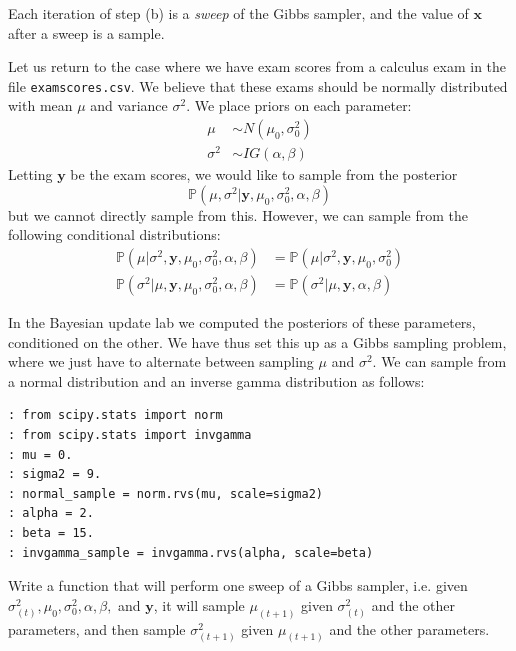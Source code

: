Each iteration of step (b) is a \emph{sweep} of the Gibbs sampler, and the value of $\mathbf{x}$ after a sweep is a sample.

Let us return to the case where we have exam scores from a calculus exam in the file \texttt{examscores.csv}. We believe that these exams should be normally distributed with mean $\mu$ and variance $\sigma^{2}$. We place priors on each parameter:
\begin{align*}
\mu & \sim N(\mu_{0}, \sigma_{0}^{2}) \\
\sigma^{2} & \sim IG(\alpha, \beta)
\end{align*}
Letting $\mathbf{y}$ be the exam scores, we would like to sample from the posterior
\begin{equation*}
\mathbb{P}(\mu, \sigma^{2} | \mathbf{y}, \mu_{0}, \sigma_{0}^{2}, \alpha, \beta)
\end{equation*}
but we cannot directly sample from this. However, we can sample from the following conditional distributions:
\begin{align*}
\mathbb{P}(\mu | \sigma^{2}, \mathbf{y}, \mu_{0}, \sigma_{0}^{2}, \alpha, \beta) & = \mathbb{P}(\mu | \sigma^{2}, \mathbf{y}, \mu_{0}, \sigma_{0}^{2})\\
\mathbb{P}(\sigma^{2} | \mu, \mathbf{y}, \mu_{0}, \sigma_{0}^{2}, \alpha, \beta) & = \mathbb{P}(\sigma^{2} | \mu, \mathbf{y}, \alpha, \beta)
\end{align*}

In the Bayesian update lab we computed the posteriors of these parameters, conditioned on the other. We have thus set this up as a Gibbs sampling problem, where we just have to alternate between sampling $\mu$ and $\sigma^{2}$. We can sample from a normal distribution and an inverse gamma distribution as follows:
\begin{lstlisting}
: from scipy.stats import norm
: from scipy.stats import invgamma
: mu = 0.
: sigma2 = 9.
: normal_sample = norm.rvs(mu, scale=sigma2)
: alpha = 2.
: beta = 15.
: invgamma_sample = invgamma.rvs(alpha, scale=beta)
\end{lstlisting}

\begin{problem}
Write a function that will perform one sweep of a Gibbs sampler, i.e. given $\sigma_{(t)}^{2}, \mu_{0}, \sigma_{0}^{2}, \alpha, \beta,$ and $\mathbf{y}$, it will sample $\mu_{(t+1)}$ given $\sigma_{(t)}^{2}$ and the other parameters, and then sample $\sigma_{(t+1)}^{2}$ given $\mu_{(t+1)}$ and the other parameters.
\end{problem}

